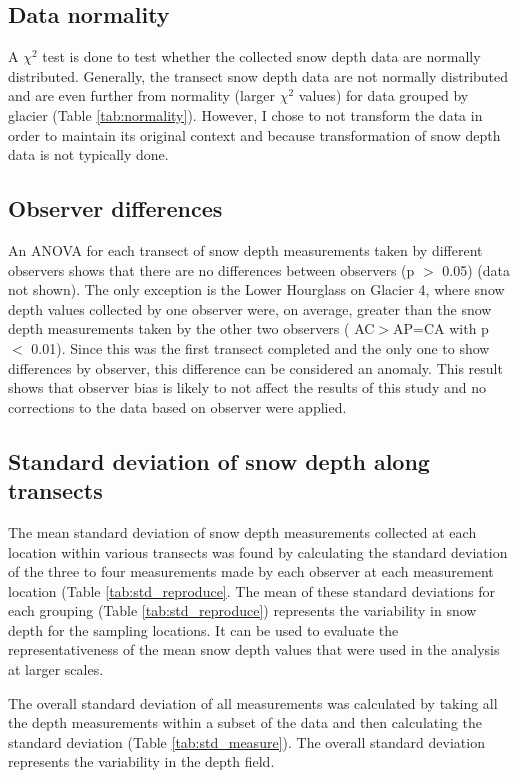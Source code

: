 \documentclass{sfuthesis}
\begin{document}
\begin{appendices}
\subsection{Data normality}

A $\chi^2$ test is done to test whether the collected snow depth data are normally distributed. Generally, the transect snow depth data are not normally distributed and are even further from normality (larger $\chi^2$ values) for data grouped by glacier (Table \ref{tab:normality}). However, I chose to not transform the data in order to maintain its original context and because transformation of snow depth data is not typically done.  

\subsection{Observer differences}

An ANOVA for each transect of snow depth measurements taken by different observers shows that there are no differences between observers (p $>$ 0.05) (data not shown). The only exception is the Lower Hourglass on Glacier 4, where snow depth values collected by one observer were, on average, greater than the snow depth measurements taken by the other two observers ( AC$>$AP=CA with p $<$ 0.01). Since this was the first transect completed and the only one to show differences by observer, this difference can be considered an anomaly. This result shows that observer bias is likely to not affect the results of this study and no corrections to the data based on observer were applied.

\subsection{Standard deviation of snow depth along transects}
\label{sec:stdTransects}

The mean standard deviation of snow depth measurements collected at each location within various transects was found by calculating the standard deviation of the three to four measurements made by each observer at each measurement location (Table \ref{tab:std_reproduce}. The mean of these standard deviations for each grouping (Table \ref{tab:std_reproduce}) represents the variability in snow depth for the sampling locations. It can be used to evaluate the representativeness of the mean snow depth values that were used in the analysis at larger scales.

The overall standard deviation of all measurements was calculated by taking all the depth measurements within a subset of the data and then calculating the standard deviation (Table \ref{tab:std_measure}). The overall standard deviation represents the variability in the depth field. 


\end{appendices}
\end{document}
